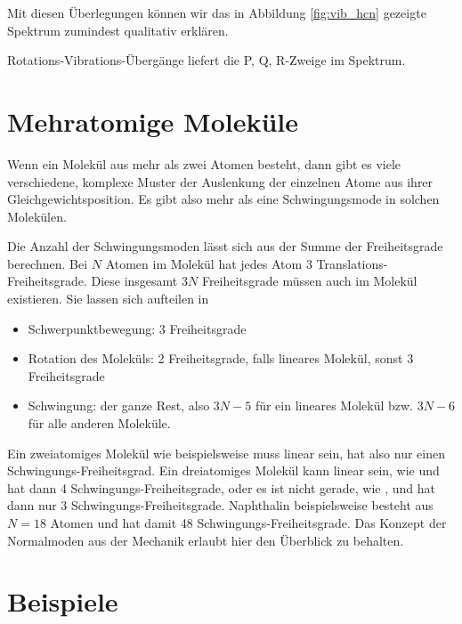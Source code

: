 Mit diesen Überlegungen können wir das in Abbildung \ref{fig:vib_hcn} gezeigte Spektrum zumindest qualitativ erklären.


\begin{marginfigure}
\caption{Rotations-Vibrations-Übergänge liefert die P, Q, R-Zweige im Spektrum.}
\end{marginfigure}
 
 



\section{Mehratomige Moleküle}

Wenn ein Molekül aus mehr als zwei Atomen besteht, dann gibt es viele verschiedene, komplexe Muster der Auslenkung der einzelnen Atome aus ihrer Gleichgewichtsposition. Es gibt also mehr als eine Schwingungsmode in solchen Molekülen.

Die Anzahl der Schwingungsmoden lässt sich aus der Summe der Freiheitsgrade berechnen. Bei $N$ Atomen im Molekül hat jedes Atom $3$ Translations-Freiheitsgrade. Diese insgesamt $3N$ Freiheitsgrade müssen auch im Molekül existieren. Sie lassen sich aufteilen in
\begin{itemize} \setlength{\itemsep}{0pt}
\item Schwerpunktbewegung: 3 Freiheitsgrade
\item Rotation des Moleküls: 2 Freiheitsgrade, falls lineares Molekül, sonst 3 Freiheitsgrade
\item Schwingung: der ganze Rest, also $3N-5$ für ein lineares Molekül bzw. $3N-6$ für alle anderen Moleküle. 
\end{itemize}

Ein zweiatomiges Molekül wie beispielsweise  muss linear sein, hat also nur einen Schwingungs-Freiheitsgrad. Ein dreiatomiges Molekül kann linear sein, wie  und hat dann 4  Schwingungs-Freiheitsgrade, oder es ist nicht gerade, wie , und hat dann nur 3  Schwingungs-Freiheitsgrade. Naphthalin beispielsweise besteht aus $N=18$ Atomen und hat damit  48 Schwingungs-Freiheitsgrade. Das Konzept der Normalmoden aus der Mechanik erlaubt hier den Überblick zu behalten.

\section{Beispiele}

